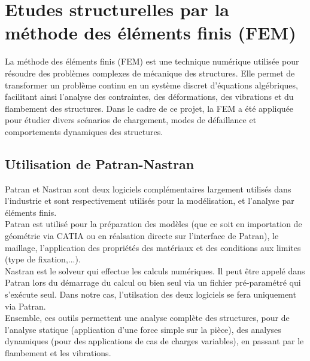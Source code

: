 \section{Etudes structurelles par la méthode des éléments finis (\acrshort{FEM})}

La méthode des éléments finis (\acrshort{FEM}) est une technique numérique 
utilisée pour résoudre des problèmes complexes de mécanique des structures. Elle permet 
de transformer un problème continu en un système discret d'équations algébriques, 
facilitant ainsi l'analyse des contraintes, des déformations, des vibrations et du 
flambement des structures. Dans le cadre de ce projet, la \acrshort{FEM} a été appliquée 
pour étudier divers scénarios de chargement, modes de défaillance et comportements 
dynamiques des structures.

\subsection{Utilisation de Patran-Nastran}

Patran et Nastran sont deux logiciels complémentaires largement utilisés dans l'industrie
et sont respectivement utilisés pour la modélisation, et l'analyse par éléments finis.\\
Patran est utilisé pour la préparation des modèles (que ce soit en importation de géométrie 
via CATIA ou en réalsation directe sur l'interface de Patran), le maillage, 
l'application des propriétés des matériaux et des conditions aux limites (type de fixation,...).\\
Nastran est le solveur qui effectue les calculs numériques. Il peut être appelé dans 
Patran lors du démarrage du calcul ou bien seul via un fichier pré-paramétré qui 
s'exécute seul. Dans notre cas, l'utilsation des deux logiciels se fera uniquement via 
Patran.\\
Ensemble, ces outils permettent une analyse complète des structures, pour de l'analyse statique 
(application d'une force simple sur la pièce), des analyses dynamiques (pour des applications 
de cas de charges variables), en passant par le flambement et les vibrations.\\
 

